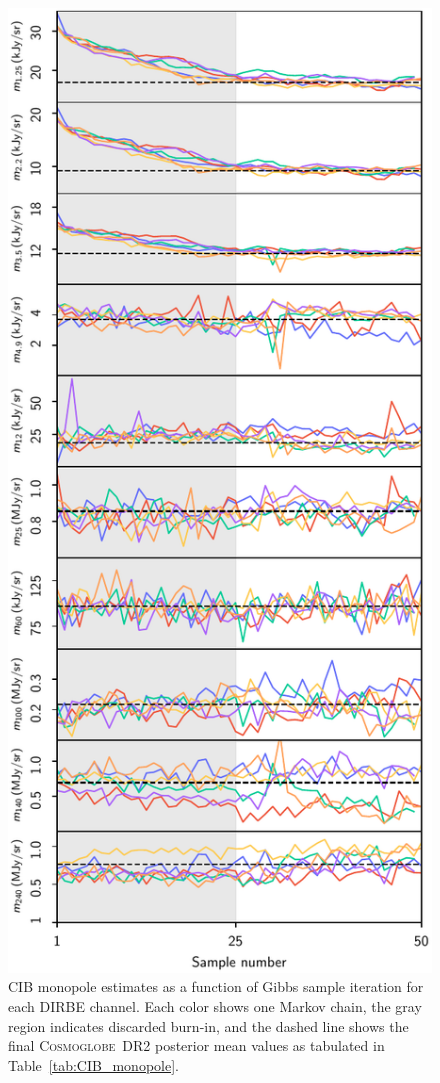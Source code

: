 \documentclass{aa}
\def\Cosmoglobe{\textsc{Cosmoglobe}}
\begin{document}
\begin{figure}
  \centering
  \includegraphics[width=\linewidth]{figs/traceplot_DR2_CIBmono.pdf}
  \caption{CIB monopole estimates as a function of Gibbs sample iteration for each DIRBE channel. Each color shows one Markov chain, the gray region indicates discarded burn-in, and the dashed line shows the final \Cosmoglobe\ DR2 posterior mean values as tabulated in Table~\ref{tab:CIB_monopole}.  }
  \label{fig:traceplot}
\end{figure}
\end{document}

